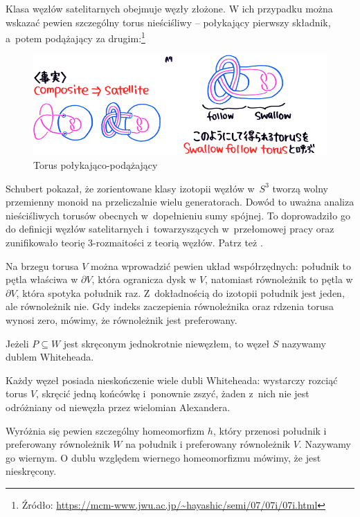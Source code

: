 \begin{example}
	Klasa węzłów satelitarnych obejmuje węzły złożone.
	W ich przypadku można wskazać pewien szczególny torus nieściśliwy -- połykający pierwszy składnik, a~potem podążający za drugim:\footnote{Źródło: \url{https://mcm-www.jwu.ac.jp/~hayashic/semi/07/07i/07i.html}}
	\begin{figure}[H]
	    \centering
	    \includegraphics[width=0.75\linewidth]{../data/mixed/follow-swallow.png}
	    \caption[something]{Torus połykająco-podążający}
	\end{figure}
\end{example}

Schubert pokazał, że zorientowane klasy izotopii węzłów w~$S^3$ tworzą wolny przemienny monoid na przeliczalnie wielu generatorach.
Dowód to uważna analiza nieściśliwych torusów obecnych w~dopełnieniu sumy spójnej.
To doprowadziło go do definicji węzłów satelitarnych i~towarzyszących w~przełomowej pracy \cite{schubert53} oraz zunifikowało teorię 3-rozmaitości z teorią węzłów.
Patrz też \cite{motegi97}.

Na brzegu torusa $V$ można wprowadzić pewien układ współrzędnych: południk to pętla właściwa w $\partial V$, która ogranicza dysk w $V$, natomiast równoleżnik to pętla w $\partial V$, która spotyka południk raz.
Z~dokładnością do izotopii południk jest jeden, ale równoleżnik nie.
Gdy indeks zaczepienia równoleżnika oraz rdzenia torusa wynosi zero, mówimy, że równoleżnik jest preferowany.

\begin{definition}
    Jeżeli $P \subseteq W$ jest skręconym jednokrotnie niewęzłem, to węzeł $S$ nazywamy dublem Whiteheada.
\end{definition}

Każdy węzeł posiada nieskończenie wiele dubli Whiteheada: wystarczy rozciąć torus $V$, skręcić jedną końcówkę i~ponownie zszyć, żaden z~nich nie jest odróżniany od niewęzła przez wielomian Alexandera.

Wyróżnia się pewien szczególny homeomorfizm $h$, który przenosi południk i preferowany równoleżnik $W$ na południk i preferowany równoleżnik $V$.
Nazywamy go wiernym.
O dublu względem wiernego homeomorfizmu mówimy, że jest nieskręcony.


